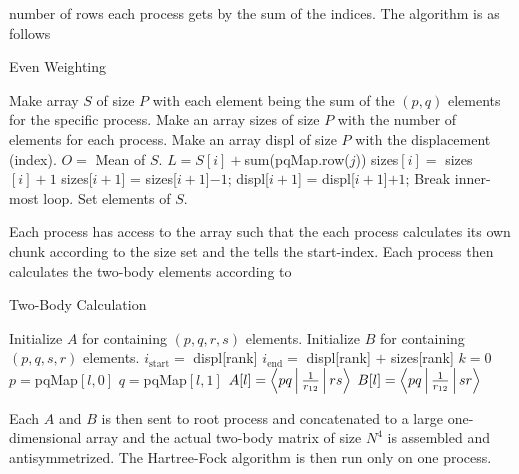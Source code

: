     number of rows each process gets by the sum of the indices. The algorithm
    is as follows
        \begin{algorithm}[H]
            \caption{Even Weighting}\label{alg:parasumweight}
            \begin{algorithmic}[H]
                \State Make array $S$ of size $P$ with each element being the
                sum of the $(p,q)$ elements for the specific process.
                \State Make an array sizes of size $P$ with the number of
                elements for each process.
                \State Make an array displ of size $P$ with the displacement
                (index).
                \State $O =$ Mean of $S$.
                        \State $L = S[i] + $sum(pqMap.row($j$))
                            \State sizes$[i] =$ sizes$[i] + 1$
                            \State sizes[$i+1$] = sizes[$i+1$]$ - 1$;
                            \State displ[$i+1$] = displ[$i+1$]$ + 1$;
                            \State Break inner-most loop.
                        \EndIf
                    \EndFor
                    \State Set elements of $S$.
                \EndFor
            \end{algorithmic}
        \end{algorithm}
    Each process has access to the  array such that the each
    process calculates its own chunk according to the size set and the
     tells the start-index. Each process then calculates the
    two-body elements according to
        \begin{algorithm}[H]
            \caption{Two-Body Calculation}\label{alg:paratwobody}
            \begin{algorithmic}[H]
                \State Initialize $A$ for containing $(p,q,r,s)$ elements.
                \State Initialize $B$ for containing $(p,q,s,r)$ elements.
                \State $i_{\text{start}} =$ displ[rank]
                \State $i_{\text{end}} =$ displ[rank] $+$ sizes[rank]
                \State $k=0$
                            \State $p=$pqMap$[l,0]$
                            \State $q=$pqMap$[l,1]$
                            \State $A[l]=\Braket{pq|\frac{1}{r_{12}}|rs}$
                            \State $B[l]=\Braket{pq|\frac{1}{r_{12}}|sr}$
                        \EndFor
                    \EndFor
                \EndFor
            \end{algorithmic}
        \end{algorithm}
    Each $A$ and $B$ is then sent to root process and concatenated to a large
    one-dimensional array and the actual two-body matrix of size $N^4$ is
    assembled and antisymmetrized. The Hartree-Fock algorithm is then run only
    on one process.
    
